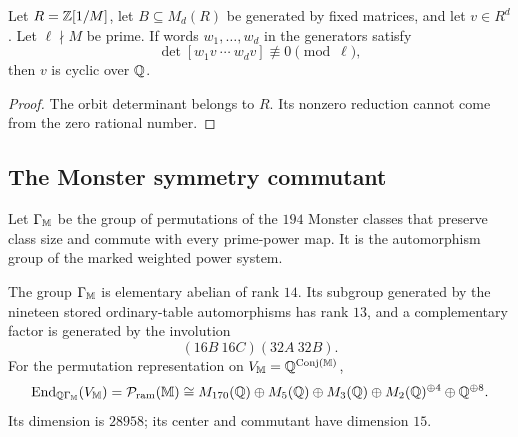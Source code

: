 \begin{lemma}
\label{lem:modular-cyclicity}
Let \(R=\mathbb Z[1/M]\), let \(B\subseteq M_d(R)\) be generated by fixed
matrices, and let \(v\in R^d\).  Let \(\ell\nmid M\) be prime.  If words
\(w_1,\ldots,w_d\) in the generators satisfy
\[
 \det[w_1v\ \cdots\ w_dv]\not\equiv0\pmod\ell,
\]
then \(v\) is cyclic over \(\mathbb Q\).
\end{lemma}

\begin{proof}
The orbit determinant belongs to \(R\).  Its nonzero reduction cannot
come from the zero rational number.
\end{proof}

\subsection{The Monster symmetry commutant}

Let \(\Gamma_{\mathbb M}\) be the group of permutations of the \(194\) Monster
classes that preserve class size and commute with every prime-power map.  It
is the automorphism group of the marked weighted power system.

\begin{theorem}
\label{thm:monster-symmetry-commutant}
The group \(\Gamma_{\mathbb M}\) is elementary abelian of rank \(14\).  Its
subgroup generated by the nineteen stored ordinary-table automorphisms has
rank \(13\), and a complementary factor is generated by
the involution
\[
 (16B\ 16C)(32A\ 32B).
\]
For the permutation representation on
\(V_{\mathbb M}=\mathbb Q^{\operatorname{Conj}(\mathbb M)}\),
\[
 \operatorname{End}_{\mathbb Q\Gamma_{\mathbb M}}(V_{\mathbb M})
 =\mathcal P_{\mathrm{ram}}(\mathbb M)
 \cong
 M_{170}(\mathbb Q)\oplus M_5(\mathbb Q)\oplus M_3(\mathbb Q)
 \oplus M_2(\mathbb Q)^{\oplus4}\oplus\mathbb Q^{\oplus8}.
\]
Its dimension is \(28958\); its center and commutant have dimension \(15\).
\end{theorem}

